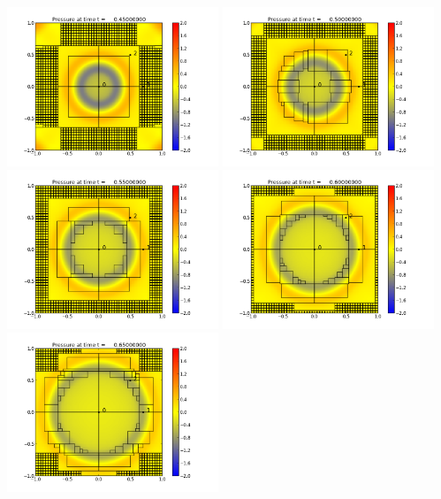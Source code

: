 \documentclass[11pt]{article}
\begin{document}
\vskip 10pt 
\includegraphics[width=0.475\textwidth]{frame0009fig0.png}
\vskip 10pt 
\includegraphics[width=0.475\textwidth]{frame0010fig0.png}
\vskip 10pt 
\includegraphics[width=0.475\textwidth]{frame0011fig0.png}
\vskip 10pt 
\includegraphics[width=0.475\textwidth]{frame0012fig0.png}
\vskip 10pt 
\includegraphics[width=0.475\textwidth]{frame0013fig0.png}
\end{document}
